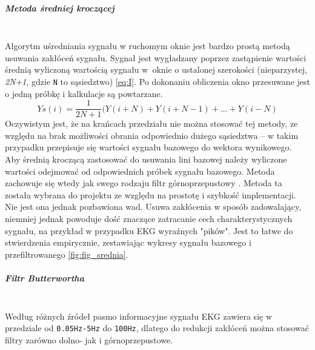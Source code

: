 \documentclass[a4paper, 11pt]{article}
\begin{document}
\subparagraph{Metoda średniej kroczącej}
\mbox{} \\
Algorytm uśredniania sygnału w ruchomym oknie jest bardzo prostą metodą usuwania zakłóceń sygnału. Sygnał jest wygładzany poprzez zastąpienie wartości średnią wyliczoną wartością sygnału w~oknie o ustalonej szerokości (nieparzystej, \textit{2N+1}, gdzie \verb|N| to sąsiedztwo) \eqref{eq:I}. Po dokonaniu obliczenia okno przesuwane jest o jedną próbkę i kalkulacje są powtarzane. 
\begin{equation}
Ys(i) = \frac{1}{2N+1}(Y(i+N)+Y(i+N-1)+...+Y(i-N) \label{eq:I}
\end{equation}
Oczywistym jest, że na krańcach przedziału nie można stosować tej metody, ze względu na brak możliwości obrania odpowiednio dużego sąsiedztwa -- w takim przypadku przepisuje się wartości sygnału bazowego do wektora wynikowego.\\
Aby średnią kroczącą zastosować do usuwania lini bazowej należy wyliczone wartości odejmować od odpowiednich próbek sygnału bazowego. Metoda zachowuje się wtedy jak swego rodzaju filtr górnoprzepustowy \cite{KAUR1}. Metoda ta została wybrana do projektu ze względu na prostotę i szybkość implementacji. Nie jest ona jednak pozbawiona wad. Usuwa zakłócenia w sposób zadowalający, niemniej jednak powoduje dość znaczące zatracanie cech charakterystycznych sygnału, na przykład w przypadku EKG wyraźnych "pików". Jest to łatwe do stwierdzenia empirycznie, zestawiając wykresy sygnału bazowego i przefiltrowanego \eqref{fig:fig_srednia}.

\subparagraph{Filtr Butterwortha}
\mbox{} \\
Według różnych źródeł \cite{JAGT1} pasmo informacyjne sygnału EKG zawiera się w przedziale od \verb|0.05Hz-5Hz| do \verb|100Hz|, dlatego do redukcji zakłóceń można stosować filtry zarówno dolno- jak i górnoprzepustowe.\\
\end{document}
